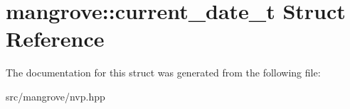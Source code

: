 \hypertarget{structmangrove_1_1current__date__t}{}\section{mangrove\+:\+:current\+\_\+date\+\_\+t Struct Reference}
\label{structmangrove_1_1current__date__t}


The documentation for this struct was generated from the following file\+:\begin{DoxyCompactItemize}
\item 
src/mangrove/nvp.\+hpp\end{DoxyCompactItemize}
